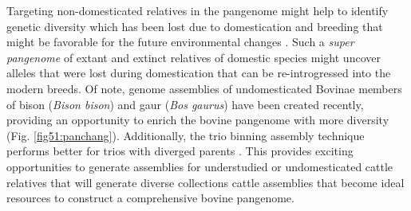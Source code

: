 \documentclass[../main.tex]{subfiles}
\begin{document}
Targeting non-domesticated relatives in the pangenome might help to identify genetic diversity which has been lost due to domestication and breeding that might be favorable for the future environmental changes \citep{khan2020super}. Such a \emph{super pangenome} of extant and extinct relatives of domestic species might uncover alleles that were lost during domestication that can be re-introgressed into the modern breeds. Of note, genome assemblies of undomesticated Bovinae members of bison (\emph{Bison bison}) \citep{oppenheimer2021reference} and gaur (\emph{Bos gaurus}) have been created recently, providing an opportunity to enrich the bovine pangenome with more diversity (Fig. \ref{fig51:panchang}). Additionally, the trio binning assembly technique performs better for trios with diverged parents \citep{rice2020continuous,heaton2021reference}. This provides exciting opportunities to generate assemblies for understudied or undomesticated cattle relatives that will generate diverse collections cattle assemblies that become ideal resources to construct a comprehensive bovine pangenome.

\singlespacing
\footnotesize






\ifdefined\BuildingFromMainFile
\else
   
\end{document}
